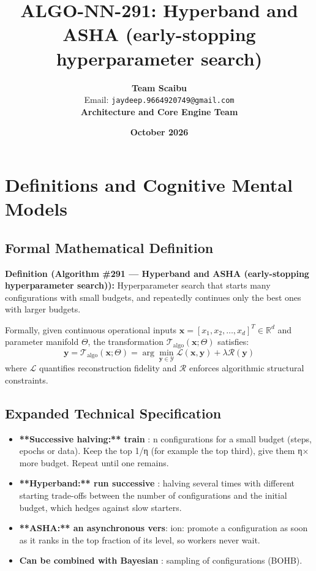 \documentclass[11pt,a4paper]{article}
\title{\textbf{ALGO-NN-291: Hyperband and ASHA (early-stopping hyperparameter search)}}
\author{\textbf{Team Scaibu} \\ \small Email: \texttt{jaydeep.9664920749@gmail.com} \\ \small \textbf{Architecture and Core Engine Team}}
\date{\textbf{October 2026}}
\theoremstyle{definition}
\begin{document}
\maketitle

\section{Definitions and Cognitive Mental Models}

\subsection{Formal Mathematical Definition}
\textbf{Definition (Algorithm \#291 --- Hyperband and ASHA (early-stopping hyperparameter search)):}
Hyperparameter search that starts many configurations with small budgets, and repeatedly continues only the best ones with larger budgets.

Formally, given continuous operational inputs $\mathbf{x} = [x_1, x_2, \dots, x_d]^T \in \mathbb{R}^d$ and parameter manifold $\Theta$, the transformation $\mathcal{T}_{\text{algo}}(\mathbf{x}; \Theta)$ satisfies:
{\boldmath
\begin{equation}
\mathbf{y} = \mathcal{T}_{\text{algo}}(\mathbf{x}; \Theta) = \arg\min_{\mathbf{y} \in \mathcal{Y}} \mathcal{L}(\mathbf{x}, \mathbf{y}) + \lambda \mathcal{R}(\mathbf{y})
\end{equation}
}
where $\mathcal{L}$ quantifies reconstruction fidelity and $\mathcal{R}$ enforces algorithmic structural constraints.

\subsection{Expanded Technical Specification}
\begin{itemize}
\item \textbf{**Successive halving:** train }: n configurations for a small budget (steps, epochs or data). Keep the top 1/η (for example the top third), give them η× more budget. Repeat until one remains.
\item \textbf{**Hyperband:** run successive }: halving several times with different starting trade-offs between the number of configurations and the initial budget, which hedges against slow starters.
\item \textbf{**ASHA:** an asynchronous vers}: ion: promote a configuration as soon as it ranks in the top fraction of its level, so workers never wait.
\item \textbf{Can be combined with Bayesian }: sampling of configurations (BOHB).
\end{itemize}
\end{document}
